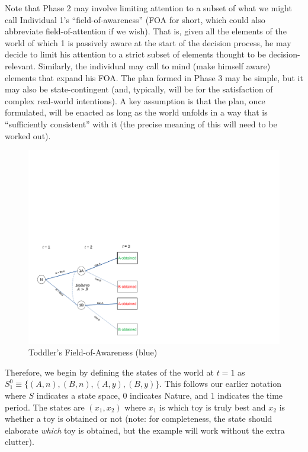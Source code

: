\documentclass[
11pt,
titlepage,
reqno,
]{article}%
\theoremstyle{definition}
\begin{document}
Note that Phase 2 may involve limiting attention to a subset of what we might call Individual 1's ``field-of-awareness'' (FOA for short, which could also abbreviate field-of-attention if we wish). That is, given all the elements of the world of which 1 is passively aware at the start of the decision process, he may decide to limit his attention to a strict subset of elements thought to be  decision-relevant. Similarly, the individual may call to mind (make himself aware) elements that expand his FOA. The plan formed in Phase 3 may be simple, but it may also be state-contingent (and, typically, will be for the satisfaction of complex real-world intentions). A key assumption is that the plan, once formulated, will be enacted as long as the world unfolds in a way that is ``sufficiently consistent'' with it (the precise meaning of this will need to be worked out). 

\begin{figure}[h!]
	\centering
	\includegraphics*[page=2,trim = 0in 4.5in 8in .5in,scale=1]{Awareness_Diagrams_All}
	\caption{Toddler's Field-of-Awareness (blue)\label{Diag: p-02}}%
\end{figure}

Therefore, we begin by defining the states of the world at $t=1$ as $S^0_1\equiv \{(A,n),(B,n),(A,y),(B,y)\}$. This follows our earlier notation where $S$ indicates a state space, $0$ indicates Nature, and $1$ indicates the time period. The states are $(x_1,x_2)$ where $x_1$ is which toy is truly best and $x_2$ is whether a toy is obtained or not (note: for completeness, the state should elaborate \textit{which} toy is obtained, but the example will work without the extra clutter). 
\end{document}
